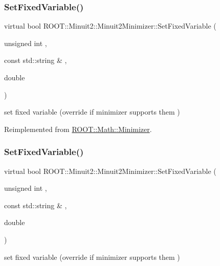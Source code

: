 \subsubsection{\texorpdfstring{SetFixedVariable()}{SetFixedVariable()}\hspace{0.1cm}{\footnotesize\ttfamily [1/2]}}
{\footnotesize\ttfamily virtual bool R\+O\+O\+T\+::\+Minuit2\+::\+Minuit2\+Minimizer\+::\+Set\+Fixed\+Variable (\begin{DoxyParamCaption}\item[{unsigned int}]{,  }\item[{const std\+::string \&}]{,  }\item[{double}]{ }\end{DoxyParamCaption})\hspace{0.3cm}{\ttfamily [virtual]}}



set fixed variable (override if minimizer supports them ) 



Reimplemented from \mbox{\hyperlink{classROOT_1_1Math_1_1Minimizer_a063e9d83c8a61afc8798ebb1d74b6f2b}{R\+O\+O\+T\+::\+Math\+::\+Minimizer}}.

\mbox{\label{classROOT_1_1Minuit2_1_1Minuit2Minimizer_af42341b80ebb02d8c0882beaa781e7bd}} 
\subsubsection{\texorpdfstring{SetFixedVariable()}{SetFixedVariable()}\hspace{0.1cm}{\footnotesize\ttfamily [2/2]}}
{\footnotesize\ttfamily virtual bool R\+O\+O\+T\+::\+Minuit2\+::\+Minuit2\+Minimizer\+::\+Set\+Fixed\+Variable (\begin{DoxyParamCaption}\item[{unsigned int}]{,  }\item[{const std\+::string \&}]{,  }\item[{double}]{ }\end{DoxyParamCaption})\hspace{0.3cm}{\ttfamily [virtual]}}



set fixed variable (override if minimizer supports them ) 




